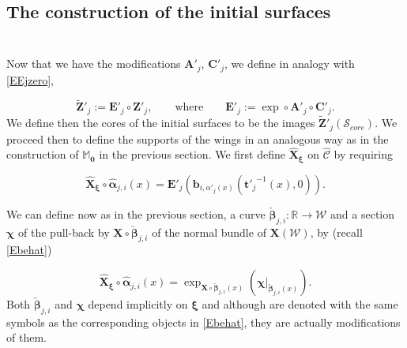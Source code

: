 \documentclass[12pt,namelimits,sumlimits]{amsart}
\theoremstyle{remark}
\numberwithin{equation}{section}
\begin{document}
\subsection*{The construction of the initial surfaces}
$\phantom{ab}$
\nopagebreak

Now that we have the modifications ${\boldsymbol{A}}'_j$, ${\boldsymbol{C}}'_j$,
we define in analogy with \ref{EEjzero},
\addtocounter{theorem}{1}
\begin{equation}
\label{EEjq}
{\widetilde{\boldsymbol{Z}}}'_j:={\boldsymbol{E}}'_j\circ{\boldsymbol{Z}}'_j,
\qquad
\text{where}
\qquad
{\boldsymbol{E}}'_j:=\exp\circ{\boldsymbol{A}}'_j\circ{\boldsymbol{C}}'_j.
\end{equation}
We define then the cores of the initial surfaces to be the images ${\widetilde{\boldsymbol{Z}}}'_j({{\mathcal{S}_{core}}})$.
We proceed then to define the supports of the wings in an analogous way
as in the construction of ${\mathbb{M}}_{{\boldsymbol{0}}}$ in the previous section.
We first define ${\widehat{\boldsymbol{X}}}_{{\boldsymbol{\xi}}}$ on ${{\widehat{{\mathcal{C}}}}}$ by requiring
\addtocounter{theorem}{1}
\begin{equation}
\label{EXhatxi}
{\widehat{\boldsymbol{X}}}_{{\boldsymbol{\xi}}}\circ{\widehat{\boldsymbol{\alpha}}}_{j,i}(x)
=
{\boldsymbol{E}}'_j
\left({\boldsymbol{b}}_{i,\alpha'_j(x)}({{\boldsymbol{t}}'_j}^{-1}(x),0)\right).
\end{equation}

We can define now as in the previous section, a curve ${\check{\boldsymbol{\beta}}}_{j,i}:{\mathbb{R}}\to{{\mathcal{W}}}$
and a section ${\boldsymbol{\chi}}$ of the pull-back by ${\boldsymbol{X}}\circ{\check{\boldsymbol{\beta}}}_{j,i}$ of the normal bundle of ${\boldsymbol{X}}({{\mathcal{W}}})$,
by (recall \ref{Ebehat})
\addtocounter{theorem}{1}
\begin{equation}
\label{Ebehatxi}
{\widehat{\boldsymbol{X}}}_{{\boldsymbol{\xi}}}\circ{\widehat{\boldsymbol{\alpha}}}_{j,i}(x)
=
\exp_{{\boldsymbol{X}}\circ{\check{\boldsymbol{\beta}}}_{j,i}(x)}(\left.{\boldsymbol{\chi}}\right|_{{\check{\boldsymbol{\beta}}}_{j,i}(x) }).
\end{equation}
Both ${\check{\boldsymbol{\beta}}}_{{j,i}}$ and ${\boldsymbol{\chi}}$ depend implicitly on ${{\boldsymbol{\xi}}}$ and although
are denoted with the same symbols as the corresponding objects in \ref{Ebehat},
they are actually modifications of them.
\end{document}
